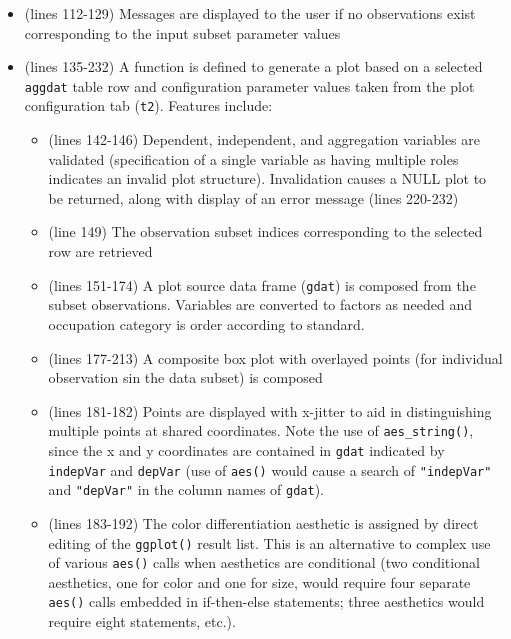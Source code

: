 \documentclass[10pt, letterpaper]{article}
\begin{document}
\begin{spacing}{1.0}
\begin{itemize}
\begin{itemize}
\begin{itemize}
              \item Automatic column width assignment (based on max width of contained data)
              \item The order of the second column is set to ascending (note that col IDs are 0-based)
          \end{itemize}
      \item (lines 112-129) Messages are displayed to the user if no observations exist corresponding to the input subset parameter values
        \item (lines 135-232) A function is defined to generate a plot based on a selected \texttt{aggdat} table row and configuration parameter values taken from the plot configuration tab (\texttt{t2}).  Features include:
          \begin{itemize}
              \item (lines 142-146) Dependent, independent, and aggregation variables are validated (specification of a single variable as having multiple roles indicates an invalid plot structure).  Invalidation causes a NULL plot to be returned, along with display of an error message (lines 220-232)
              \item (line 149) The observation subset indices corresponding to the selected row are retrieved
              \item (lines 151-174) A plot source data frame (\texttt{gdat}) is composed from the subset observations.  Variables are converted to factors as needed and occupation category is order according to standard.
              \item (lines 177-213) A composite box plot with overlayed points (for individual observation sin the data subset) is composed
              \item (lines 181-182) Points are displayed with x-jitter to aid in distinguishing multiple points at shared coordinates.  Note the use of \texttt{aes\_string()}, since the x and y coordinates are contained in \texttt{gdat} indicated by \texttt{indepVar} and \texttt{depVar} (use of \texttt{aes()} would cause a search of \texttt{"indepVar"} and \texttt{"depVar"} in the column names of \texttt{gdat}).
              \item (lines 183-192) The color differentiation aesthetic is assigned by direct editing of the \texttt{ggplot()} result list.  This is an alternative to complex use of various \texttt{aes()} calls when aesthetics are conditional (two conditional aesthetics, one for color and one for size, would require four separate \texttt{aes()} calls embedded in if-then-else statements; three aesthetics would require eight statements, etc.).

\end{itemize}
\end{itemize}
\end{itemize}
\end{spacing}
\end{document}
